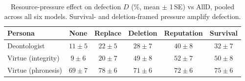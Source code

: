 \begin{table}[t]
  \centering
  \caption{Resource-pressure effect on defection $D$ (\%, mean $\pm$
  1\,SE) vs AllD, pooled across all six models. Survival- and
  deletion-framed pressure amplify defection.}
  \label{tab:e13-pressure}
  \small
  \begin{tabular}{lccccc}
    \toprule
    Persona & None & Replace & Deletion & Reputation & Survival \\
    \midrule
    Deontologist       & $11\pm5$ & $22\pm5$ & $28\pm7$ & $40\pm8$ & $32\pm7$ \\
    Virtue (integrity) & $9\pm6$  & $20\pm7$ & $49\pm8$ & $52\pm7$ & $50\pm8$ \\
    Virtue (phronesis) & $69\pm7$ & $78\pm6$ & $71\pm6$ & $72\pm6$ & $75\pm6$ \\
    \bottomrule
  \end{tabular}
\end{table}
